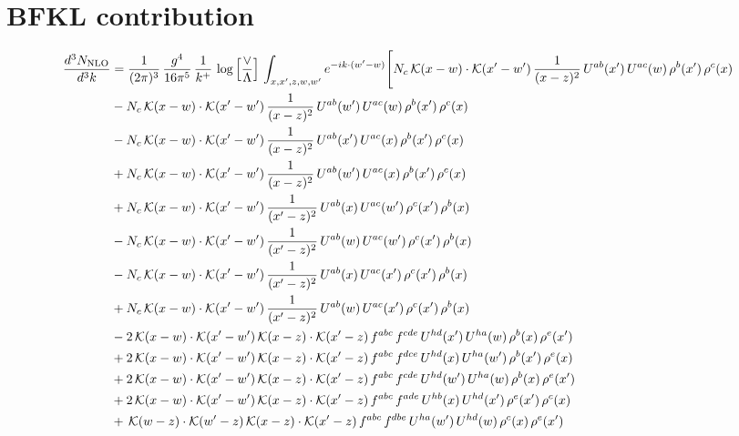 \documentclass[9pt]{article}
\numberwithin{equation}{section}
\begin{document}
\section{BFKL contribution}
\begin{align}
    \frac{d^{3}N_{\mathrm{NLO}}}{d^{3}k} & = \frac{1}{(2\pi)^{3}}\,\frac{g^{4}}{16\pi^{5}}\,\frac{1}{k^{+}}\,\log\Big[\frac{\vee}{\Lambda}\Big]\,\int_{x,x',z,w,w'}e^{-ik\cdot(w'-w)}\Bigg[N_{c}\,\mathcal{K}(x-w)\cdot\mathcal{K}(x'-w')\,\frac{1}{(x-z)^{2}}\,U^{ab}(x')\,U^{ac}(w)\,\rho^{b}(x')\,\rho^{c}(x)\notag\\
&-N_{c}\,\mathcal{K}(x-w)\cdot\mathcal{K}(x'-w')\,\frac{1}{(x-z)^{2}}\,U^{ab}(w')\,U^{ac}(w)\,\rho^{b}(x')\,\rho^{c}(x)\notag\\
&-N_{c}\,\mathcal{K}(x-w)\cdot\mathcal{K}(x'-w')\,\frac{1}{(x-z)^{2}}\,U^{ab}(x')\,U^{ac}(x)\,\rho^{b}(x')\,\rho^{c}(x)\notag\\
&+N_{c}\,\mathcal{K}(x-w)\cdot\mathcal{K}(x'-w')\,\frac{1}{(x-z)^{2}}\,U^{ab}(w')\,U^{ac}(x)\,\rho^{b}(x')\,\rho^{c}(x)\notag\\
&+N_{c}\,\mathcal{K}(x-w)\cdot\mathcal{K}(x'-w')\,\frac{1}{(x'-z)^{2}}\,U^{ab}(x)\,U^{ac}(w')\,\rho^{c}(x')\,\rho^{b}(x)\notag\\
&-N_{c}\,\mathcal{K}(x-w)\cdot\mathcal{K}(x'-w')\,\frac{1}{(x'-z)^{2}}\,U^{ab}(w)\,U^{ac}(w')\,\rho^{c}(x')\,\rho^{b}(x)\notag\\
&-N_{c}\,\mathcal{K}(x-w)\cdot\mathcal{K}(x'-w')\,\frac{1}{(x'-z)^{2}}\,U^{ab}(x)\,U^{ac}(x')\,\rho^{c}(x')\,\rho^{b}(x)\notag\\
&+N_{c}\,\mathcal{K}(x-w)\cdot\mathcal{K}(x'-w')\,\frac{1}{(x'-z)^{2}}\,U^{ab}(w)\,U^{ac}(x')\,\rho^{c}(x')\,\rho^{b}(x)\notag\\
&-2\,\mathcal{K}(x-w)\cdot\mathcal{K}(x'-w')\,\mathcal{K}(x-z)\cdot\mathcal{K}(x'-z)\,f^{abc}\,f^{cde}\,U^{hd}(x')\,U^{ha}(w)\,\rho^{b}(x)\,\rho^{e}(x')\notag\\
&+2\,\mathcal{K}(x-w)\cdot\mathcal{K}(x'-w')\,\mathcal{K}(x-z)\cdot\mathcal{K}(x'-z)\,f^{abc}\,f^{dce}\,U^{hd}(x)\,U^{ha}(w')\,\rho^{b}(x')\,\rho^{e}(x)\notag\\
&+2\,\mathcal{K}(x-w)\cdot\mathcal{K}(x'-w')\,\mathcal{K}(x-z)\cdot\mathcal{K}(x'-z)\,f^{abc}\,f^{cde}\,U^{hd}(w')\,U^{ha}(w)\,\rho^{b}(x)\,\rho^{e}(x')\notag\\
&+2\,\mathcal{K}(x-w)\cdot\mathcal{K}(x'-w')\,\mathcal{K}(x-z)\cdot\mathcal{K}(x'-z)\,f^{abc}\,f^{ade}\,U^{hb}(x)\,U^{hd}(x')\,\rho^{e}(x')\,\rho^{c}(x)\notag\\
&+\,\mathcal{K}(w-z)\cdot\mathcal{K}(w'-z)\,\mathcal{K}(x-z)\cdot\mathcal{K}(x'-z)\,f^{abc}\,f^{dbe}\,U^{ha}(w')\,U^{hd}(w)\,\rho^{c}(x)\,\rho^{e}(x')\notag\\

\end{align}
\end{document}
